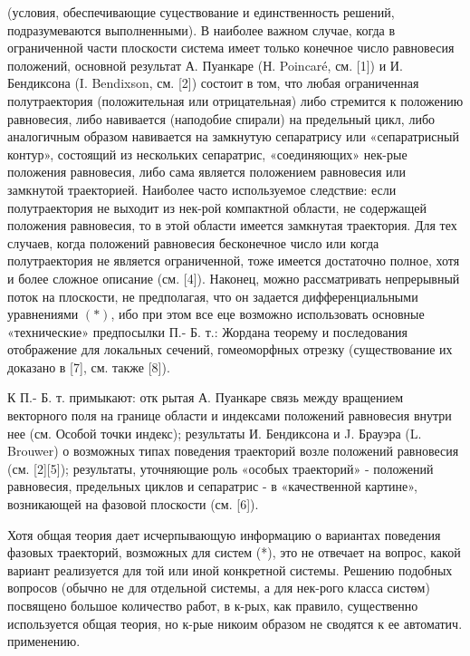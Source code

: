 \documentclass[10pt]{article}
\begin{document}
(условия, обеспечивающие суцествование и единственность решений, подразумеваются выполненными). В наиболее важном случае, когда в ограниченной части плоскости система имеет только конечное число равновесия положений, основной результат А. Пуанкаре (Н. Poincaré, см. [1]) и И. Бендиксона (I. Bendixson, см. [2]) состоит в том, что любая ограниченная полутраектория (положительная или отрицательная) либо стремится к положению равновесия, либо навивается (наподобие спирали) на предельный цикл, либо аналогичным образом навивается на замкнутую сепаратрису или «сепаратрисный контур», состоящий из нескольких сепаратрис, «соединяющих» нек-рые положения равновесия, либо сама является положением равновесия или замкнутой траекторией. Наиболее часто используемое следствие: если полутраектория не выходит из нек-рой компактной области, не содержащей положения равновесия, то в этой области имеется замкнутая траектория. Для тех случаев, когда положений равновесия бесконечное число или когда полутраектория не является ограниченной, тоже имеется достаточно полное, хотя и более сложное описание (см. [4]). Наконец, можно рассматривать непрерывный поток на плоскости, не предполагая, что он задается дифференциальными уравнениями $(*)$, ибо при этом все еце возможно использовать основные «технические» предпосылки П.- Б. т.: Жордана теорему и последования отображение для локальных сечений, гомеоморфных отрезку (существование их доказано в [7], см. также [8]).



К П.- Б. т. примыкают: отк рытая А. Пуанкаре связь между вращением векторного поля на границе области и индексами положений равновесия внутри нее (см. Особой точки индекс); результаты И. Бендиксона и J. Брауэра (L. Brouwer) о возможных типах поведения траекторий возле положений равновесия (см. [2][5]); результаты, уточняющие роль «особых траекторий» - положений равновесия, предельных циклов и сепаратрис - в «качественной картине», возникающей на фазовой плоскости (см. [6]).



Хотя общая теория дает исчерпывающую информацию о вариантах поведения фазовых траекторий, возможных для систем (*), это не отвечает на вопрос, какой вариант реализуется для той или иной конкретной системы. Решению подобных вопросов (обычно не для отдельной системы, а для нек-рого класса систөм) посвящено большое количество работ, в к-рых, как правило, существенно используется общая теория, но к-рые никоим образом не сводятся к ее автоматич. применению.
\end{document}

